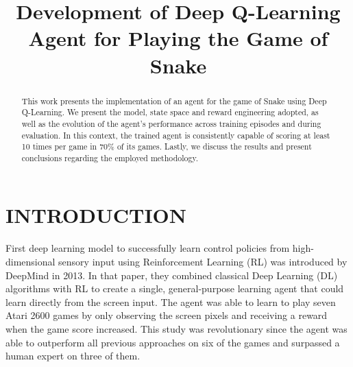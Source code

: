 \documentclass[conference]{IEEEtran}
\begin{document}
\title{Development of Deep Q-Learning Agent for Playing the Game of Snake}
\author{
\and
{}
\and
{}
}

\maketitle


\begin{abstract}


This work presents the implementation of an agent for the game of Snake using Deep Q-Learning. We present the model, state space and reward engineering adopted, as well as the evolution of the agent's performance across training episodes and during evaluation. In this context, the trained agent is consistently capable of scoring at least 10 times per game in 70\% of its games. Lastly, we discuss the results and present conclusions regarding the employed methodology.

\end{abstract}


\section{INTRODUCTION}

First deep learning model to successfully learn control policies from high-dimensional sensory input using Reinforcement Learning (RL) was introduced by DeepMind in 2013. In that paper, they combined classical Deep Learning (DL) algorithms with RL to create a single, general-purpose learning agent that could learn directly from the screen input. The agent was able to learn to play seven Atari 2600 games by only observing the screen pixels and receiving a reward when the game score increased. This study was revolutionary since the agent was able to outperform all previous approaches on six of the games and surpassed a human expert on three of them.
\end{document}
